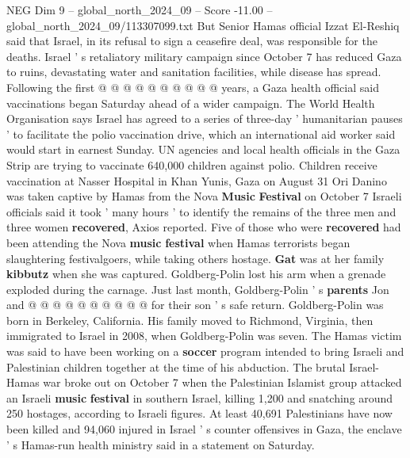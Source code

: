 \begin{textsample}{NEG Dim 9 – global\_north\_2024\_09 – Score -11.00 – global\_north\_2024\_09/113307099.txt}
But Senior Hamas official Izzat El-Reshiq said that Israel, in its refusal to sign a ceasefire deal, was responsible for the deaths.
Israel ' s retaliatory military campaign since October 7 has reduced Gaza to ruins, devastating water and sanitation facilities, while disease has spread.
Following the first @ @ @ @ @ @ @ @ @ @ years, a Gaza health official said vaccinations began Saturday ahead of a wider campaign.
The World Health Organisation says Israel has agreed to a series of three-day ' humanitarian pauses ' to facilitate the polio vaccination drive, which an international aid worker said would start in earnest Sunday.
UN agencies and local health officials in the Gaza Strip are trying to vaccinate 640,000 children against polio.
Children receive vaccination at Nasser Hospital in Khan Yunis, Gaza on August 31 Ori Danino was taken captive by Hamas from the Nova \textbf{Music} \textbf{Festival} on October 7 Israeli officials said it took ' many hours ' to identify the remains of the three men and three women \textbf{recovered}, Axios reported.
Five of those who were \textbf{recovered} had been attending the Nova \textbf{music} \textbf{festival} when Hamas terrorists began slaughtering festivalgoers, while taking others hostage. \textbf{Gat} was at her family \textbf{kibbutz} when she was captured.
Goldberg-Polin lost his arm when a grenade exploded during the carnage.
Just last month, Goldberg-Polin ' s \textbf{parents} Jon and @ @ @ @ @ @ @ @ @ @ for their son ' s safe return.
Goldberg-Polin was born in Berkeley, California.
His family moved to Richmond, Virginia, then immigrated to Israel in 2008, when Goldberg-Polin was seven.
The Hamas victim was said to have been working on a \textbf{soccer} program intended to bring Israeli and Palestinian children together at the time of his abduction.
The brutal Israel-Hamas war broke out on October 7 when the Palestinian Islamist group attacked an Israeli \textbf{music} \textbf{festival} in southern Israel, killing 1,200 and snatching around 250 hostages, according to Israeli figures.
At least 40,691 Palestinians have now been killed and 94,060 injured in Israel ' s counter offensives in Gaza, the enclave ' s Hamas-run health ministry said in a statement on Saturday.

\end{textsample}

